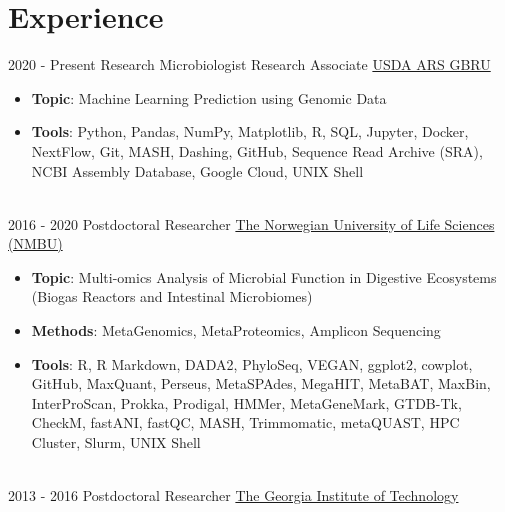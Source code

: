 \documentclass[letterpaper]{twentysecondcv3} %
\begin{document}
\makeprofile %
 

\section{Experience}

\begin{twenty} %
\twentyitem
    	{2020 -}
		{Present}
        {Research Microbiologist Research Associate}
        {\href{https://www.ars.usda.gov/southeast-area/stoneville-ms/genomics-and-bioinformatics-research/}{USDA ARS GBRU}}
        {}
        {\begin{itemize}
        \item \textbf{Topic}: Machine Learning Prediction using Genomic Data        
        \item \textbf{Tools}: Python, Pandas, NumPy, Matplotlib, R, SQL, Jupyter, Docker, NextFlow, Git, MASH, Dashing, GitHub, Sequence Read Archive (SRA), NCBI Assembly Database, Google Cloud, UNIX Shell
        \end{itemize}}
        \\
	\twentyitem
    	{2016 -}
		{2020}
        {Postdoctoral Researcher}
        {\href{https://www.nmbu.no/}{The Norwegian University of Life Sciences (NMBU)}}
        {}
        {
        {\begin{itemize}
        \item \textbf{Topic}: Multi-omics Analysis of Microbial Function in Digestive Ecosystems (Biogas Reactors and Intestinal Microbiomes)   
        \item \textbf{Methods}: MetaGenomics, MetaProteomics, Amplicon Sequencing
        \item \textbf{Tools}: R, R Markdown, DADA2, PhyloSeq, VEGAN, ggplot2, cowplot, GitHub, MaxQuant, Perseus, MetaSPAdes, MegaHIT, MetaBAT, MaxBin, InterProScan, Prokka, Prodigal, HMMer, MetaGeneMark, GTDB-Tk, CheckM, fastANI, fastQC, MASH, Trimmomatic, metaQUAST, HPC Cluster, Slurm, UNIX Shell
    \end{itemize}}
        }
    \\   
    \twentyitem
   		{2013 -}
		{2016}
        {Postdoctoral Researcher}
        {\href{https://www.gatech.edu/}{The Georgia Institute of Technology}}
        {}
        {
        {\begin{itemize}

\end{itemize}}}
\end{twenty}
\end{document}
